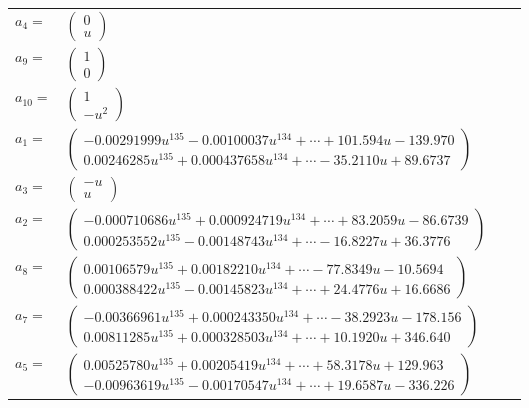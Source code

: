 \documentclass[1p]{elsarticle_modified}
\theoremstyle{definition}
\begin{document}
\begin{tabular}{m{7pt} m{180pt} m{7pt} m{180pt} }
\flushright $a_{4}=$&$\begin{pmatrix}0\\u\end{pmatrix}$ \\
\flushright $a_{9}=$&$\begin{pmatrix}1\\0\end{pmatrix}$ \\
\flushright $a_{10}=$&$\begin{pmatrix}1\\- u^2\end{pmatrix}$ \\
\flushright $a_{1}=$&$\begin{pmatrix}-0.00291999 u^{135}-0.00100037 u^{134}+\cdots+101.594 u-139.970\\0.00246285 u^{135}+0.000437658 u^{134}+\cdots-35.2110 u+89.6737\end{pmatrix}$ \\
\flushright $a_{3}=$&$\begin{pmatrix}- u\\u\end{pmatrix}$ \\
\flushright $a_{2}=$&$\begin{pmatrix}-0.000710686 u^{135}+0.000924719 u^{134}+\cdots+83.2059 u-86.6739\\0.000253552 u^{135}-0.00148743 u^{134}+\cdots-16.8227 u+36.3776\end{pmatrix}$ \\
\flushright $a_{8}=$&$\begin{pmatrix}0.00106579 u^{135}+0.00182210 u^{134}+\cdots-77.8349 u-10.5694\\0.000388422 u^{135}-0.00145823 u^{134}+\cdots+24.4776 u+16.6686\end{pmatrix}$ \\
\flushright $a_{7}=$&$\begin{pmatrix}-0.00366961 u^{135}+0.000243350 u^{134}+\cdots-38.2923 u-178.156\\0.00811285 u^{135}+0.000328503 u^{134}+\cdots+10.1920 u+346.640\end{pmatrix}$ \\
\flushright $a_{5}=$&$\begin{pmatrix}0.00525780 u^{135}+0.00205419 u^{134}+\cdots+58.3178 u+129.963\\-0.00963619 u^{135}-0.00170547 u^{134}+\cdots+19.6587 u-336.226\end{pmatrix}$ \\

\end{tabular}
\end{document}
